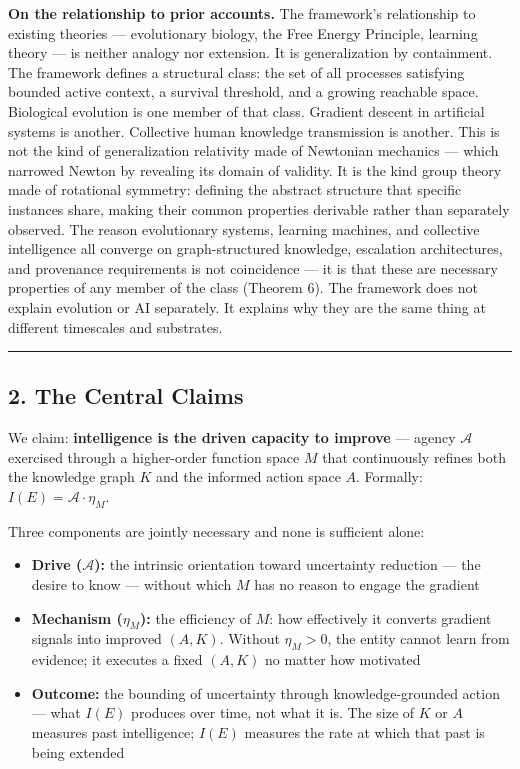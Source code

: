 \documentclass[
]{article}
\newcounter{none} %
\providecommand{\tightlist}{%
  \setlength{\itemsep}{0pt}\setlength{\parskip}{0pt}}
\begin{document}
\textbf{On the relationship to prior accounts.} The framework's
relationship to existing theories --- evolutionary biology, the Free
Energy Principle, learning theory --- is neither analogy nor extension.
It is generalization by containment. The framework defines a structural
class: the set of all processes satisfying bounded active context, a
survival threshold, and a growing reachable space. Biological evolution
is one member of that class. Gradient descent in artificial systems is
another. Collective human knowledge transmission is another. This is not
the kind of generalization relativity made of Newtonian mechanics ---
which narrowed Newton by revealing its domain of validity. It is the
kind group theory made of rotational symmetry: defining the abstract
structure that specific instances share, making their common properties
derivable rather than separately observed. The reason evolutionary
systems, learning machines, and collective intelligence all converge on
graph-structured knowledge, escalation architectures, and provenance
requirements is not coincidence --- it is that these are necessary
properties of any member of the class (Theorem 6). The framework does
not explain evolution or AI separately. It explains why they are the
same thing at different timescales and substrates.

\begin{center}\rule{0.5\linewidth}{0.5pt}\end{center}

\subsection{2. The Central Claims}\label{the-central-claims}

We claim: \textbf{intelligence is the driven capacity to improve} ---
agency \(\mathcal{A}\) exercised through a higher-order function space
\(M\) that continuously refines both the knowledge graph \(K\) and the
informed action space \(A\). Formally:
\(I(E) = \mathcal{A} \cdot \eta_M\).

Three components are jointly necessary and none is sufficient alone:

\begin{itemize}
\tightlist
\item
  \textbf{Drive (\(\mathcal{A}\)):} the intrinsic orientation toward
  uncertainty reduction --- the desire to know --- without which \(M\)
  has no reason to engage the gradient
\item
  \textbf{Mechanism (\(\eta_M\)):} the efficiency of \(M\): how
  effectively it converts gradient signals into improved \((A, K)\).
  Without \(\eta_M > 0\), the entity cannot learn from evidence; it
  executes a fixed \((A, K)\) no matter how motivated
\item
  \textbf{Outcome:} the bounding of uncertainty through
  knowledge-grounded action --- what \(I(E)\) produces over time, not
  what it is. The size of \(K\) or \(A\) measures past intelligence;
  \(I(E)\) measures the rate at which that past is being extended
\end{itemize}
\end{document}
